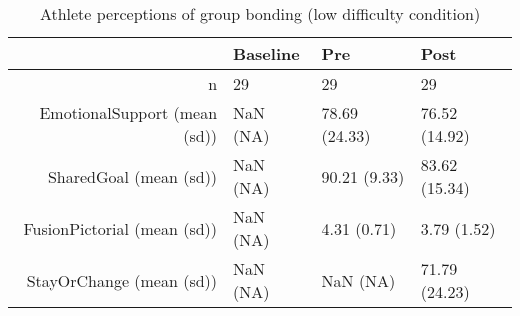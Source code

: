 \begin{table}[ht]
\centering
\begin{tabular}{rlll}
  \hline
 & Baseline & Pre & Post \\ 
  \hline
n &  29 &    29 &    29 \\ 
  EmotionalSupport (mean (sd)) & NaN (NA) & 78.69 (24.33) & 76.52 (14.92) \\ 
  SharedGoal (mean (sd)) & NaN (NA) & 90.21 (9.33) & 83.62 (15.34) \\ 
  FusionPictorial (mean (sd)) & NaN (NA) &  4.31 (0.71) &  3.79 (1.52) \\ 
  StayOrChange (mean (sd)) & NaN (NA) &   NaN (NA) & 71.79 (24.23) \\ 
   \hline
\end{tabular}
\caption{Athlete perceptions of 
 group bonding (low difficulty condition)} 
\end{table}

